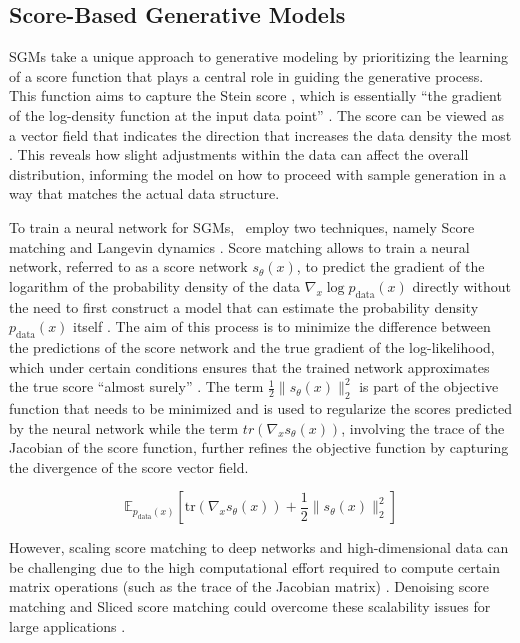 \subsection{Score-Based Generative Models}

SGMs \citep{song2019SGM} take a unique approach to generative modeling by prioritizing the learning of a score function that plays a central role in guiding the generative process. This function aims to capture the Stein score \citep{steinScore}, which is essentially ``the gradient of the log-density function at the input data point'' \citep{song2019SGM}. The score can be viewed as a vector field that indicates the direction that increases the data density the most \citep{song2019SGM}. This reveals how slight adjustments within the data can affect the overall distribution, informing the model on how to proceed with sample generation in a way that matches the actual data structure.

To train a neural network for SGMs,~\cite{song2019SGM} employ two techniques, namely Score matching and Langevin dynamics \citep{hyvarinenScoreMatching}. 
Score matching allows to train a neural network, referred to as a score network \( s_\theta(x) \), to predict the gradient of the logarithm of the probability density of the data \( \nabla_x \log p_{\text{data}}(x) \) directly without the need to first construct a model that can estimate the probability density \( p_{\text{data}}(x) \) itself \citep{song2019SGM}. The aim of this process is to minimize the difference between the predictions of the score network and the true gradient of the log-likelihood, which under certain conditions ensures that the trained network approximates the true score ``almost surely'' \citep{song2019SGM}. The term \( \frac{1}{2} \|s_\theta(x)\|^2_2 \) is part of the objective function that needs to be minimized and is used to regularize the scores predicted by the neural network while the term \( tr(\nabla_x s_\theta(x)) \), involving the trace of the Jacobian \citep{song2019SGM} of the score function, further refines the objective function by capturing the divergence of the score vector field. 

\[
\mathbb{E}_{p_{\text{data}}(x)} \left[ \text{tr}(\nabla_x s_\theta(x)) + \frac{1}{2} \|s_\theta(x)\|^2_2 \right]
\]

\citep{song2019SGM} However, scaling score matching to deep networks and high-dimensional data can be challenging due to the high computational effort required to compute certain matrix operations (such as the trace of the Jacobian matrix) \citep{song2019SGM}. 
Denoising score matching and Sliced score matching could overcome these scalability issues for large applications \citep{song2019SGM}.

